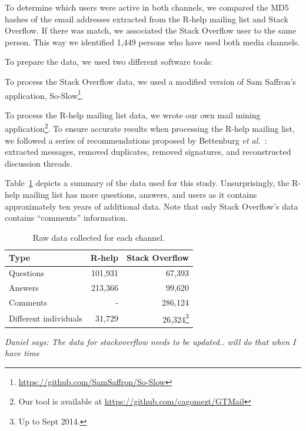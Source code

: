 \documentclass[smallextended]{svjour3}       %
\newcommand{\dmg}[1]{{\color{blue}\emph{Daniel says: #1}}\xspace}
\newcommand{\dmg}[1]{}
\newcommand{\SO}{Stack Overflow\xspace}
\newcommand{\RH}{R-help\xspace}
\begin{document}
To determine which users were active in both channels, we compared the MD5 hashes of the email addresses extracted from the \RH mailing list and \SO. If there was match, we associated the \SO user to the same person. This way we identified 1,449 persons who have used both media channels.

To prepare the data, we used two different software tools:
    \begin{enumerate*}[label=(\arabic*)]
    \item To process the \SO data, we used a modified version of Sam Saffron's application, So-Slow\footnote{\url{https://github.com/SamSaffron/So-Slow}}.
    \item To process the \RH mailing list data, we wrote our own mail mining application\footnote{Our tool is available at
            \url{https://github.com/cagomezt/GTMail}}. To ensure accurate results when processing the \RH mailing list, we followed a series of recommendations proposed by Bettenburg \textit{et al.}~\cite{Bettenburg2009}: extracted messages, removed duplicates, removed signatures, and reconstructed discussion threads.
    \end{enumerate*}
Table~\ref{table:data} depicts a summary of the data used for this study. Unsurprisingly, the \RH mailing list has more questions, answers, and users as it contains approximately ten years of additional data.
Note that only \SO's data contains ``comments'' information.

	\begin{table}[!htb]
	  \centering
      \caption{Raw data collected for each channel.}
      \begin{small}
        \begin{tabular}{lrr}
	        \toprule
	        Type          &  \RH & \SO \\
	        \midrule
	        Questions     & 101,931 &  67,393 \\
	        Answers       & 213,366 &  99,620 \\
	        Comments      &       - & 286,124 \\
          Different individuals & 31,729 &  26,324\footnote{Up to Sept
                                           2014.} \\
	        \bottomrule
        \end{tabular}
      \end{small}
	  \label{table:data}
	\end{table}

        \dmg{The data for stackoverflow needs to be updated.. will do that when I have time}
\end{document}
